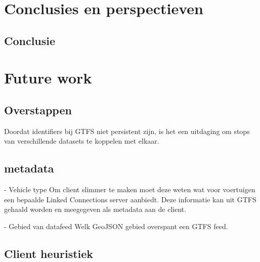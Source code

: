 
\chapter{Conclusies en perspectieven}
\label{conclusie}

\section{Conclusie}

\chapter{Future work}

\section{Overstappen}

Doordat identifiers bij GTFS niet persistent zijn, is het een uitdaging om stops van verschillende datasets te koppelen met elkaar.

\section{metadata}

- Vehicle type 
Om client slimmer te maken moet deze weten wat voor voertuigen een bepaalde Linked Connections server aanbiedt. Deze informatie kan uit GTFS gehaald worden en meegegeven als metadata aan de client.

- Gebied van datafeed
Welk GeoJSON gebied overspant een GTFS feed.

\section{Client heuristiek}